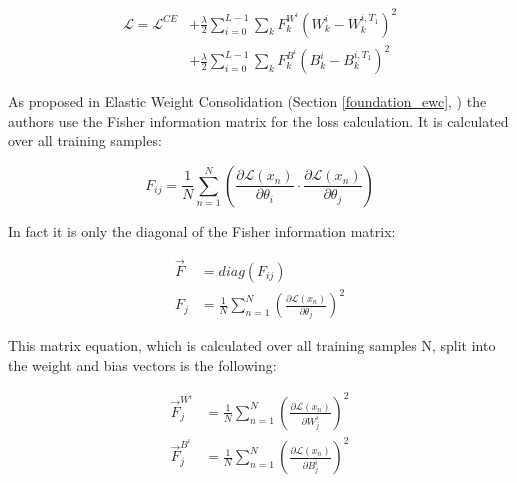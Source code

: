 \begin{equation}
    \begin{split}
        \mathcal{L} = \mathcal{L}^{CE}
        & + \frac{\lambda}{2} \sum_{i=0}^{L-1} \sum_{k} F_{k}^{W^i}\left(W^i_{k}-W^{i,{T_1}}_{k} \right)^2
        \\
        & +  \frac{\lambda}{2}\sum_{i=0}^{L-1} \sum_{k}F^{B^i}_k\left(B^i_{k}-B^{i,{T_1}}_{k} \right)^2
    \end{split}
\end{equation}

As proposed in Elastic Weight Consolidation (Section \ref{foundation_ewc}, \cite{elastic-weight-consolidation}) the authors use the Fisher information matrix for the loss calculation. It is calculated over all training samples:

\begin{equation}
    F_{ij} = 
    \frac{1}{N} 
    \sum_{n=1}^{N} 
    \left(
        \frac{\partial \mathcal{L} \left( x_n \right) }{\partial \theta_{i}} 
        \cdot 
        \frac{\partial \mathcal{L} \left( x_n \right) }{\partial \theta_{j}}
    \right)
\end{equation}

In fact it is only the diagonal of the Fisher information matrix:

\begin{equation}
    \begin{split}
        \vec{F} & = diag \left( F_{ij} \right)
        \\
        F_{j} & = 
        \frac{1}{N} 
        \sum_{n=1}^{N} 
        \left(
            \frac{\partial \mathcal{L} \left( x_n \right) }{\partial \theta_{j}}
        \right)^2
    \end{split}
\end{equation}

This matrix equation, which is calculated over all training samples N, split into the weight and bias vectors is the following:

\begin{equation}
    \begin{split}
        \vec{F}^{W^i}_j & = 
        \frac{1}{N} 
        \sum_{n=1}^{N} 
        \left(
            \frac{\partial \mathcal{L} \left( x_n \right) }{\partial W^i_{j}}
        \right)^2
        \\
        \vec{F}^{B^i}_j & = 
        \frac{1}{N} 
        \sum_{n=1}^{N} 
        \left(
            \frac{\partial \mathcal{L} \left( x_n \right) }{\partial B^i_{j}}
        \right)^2
    \end{split}
\end{equation}

